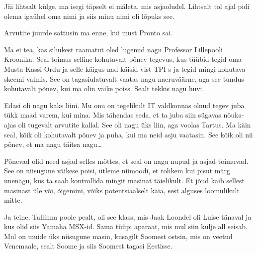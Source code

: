 \label{sisu:pronto}
                 

Jäi lihtsalt külge, ma isegi täpselt ei mäleta, mis asjaoludel. Lihtsalt tol 
ajal pidi olema igaühel oma nimi ja siis minu nimi oli lõpuks see.


Arvutite juurde sattusin ma enne, kui must Pronto sai.

Ma ei tea, kas sihukest raamatut oled lugenud nagu Professor Lillepooli 
Kroonika. 
Seal toimus selline kohutavalt põnev tegevus, kus tüübid tegid oma Musta Kassi 
Ordu ja selle käigus nad käisid vist TPI-s ja tegid mingi kohutava skeemi 
valmis. See on  tagasiulatuvalt vaatas nagu naeruväärne, aga see tundus 
kohutavalt  põnev, kui ma  olin väike poiss. Sealt tekkis nagu huvi. 

Edasi oli nagu kaks liini. Mu onu on tegelikult IT valdkonnas olnud tegev juba 
tükk maad varem, kui mina. Mis tähendas seda, et ta juba siin sügavas 
nõuka-ajas oli tugevalt arvutite kallal. See oli nagu üks liin, aga voolas 
Tartus. Ma käin seal, kõik oli kohutavalt põnev ja puha, kui ma neid asju 
vaatasin. See kõik oli nii põnev, et ma nagu täitsa nagu\ldots


Põnevad olid need asjad selles mõttes, et seal on nagu nupud ja asjad toimuvad. 
See on niisugune väikese poisi, ütleme niimoodi, et rohkem kui pisut märg 
unenägu, kus ta saab kontrollida mingit masinat täielikult. Et jõud käib 
sellest masinast üle või, õigemini, võiks potentsiaalselt käia, sest alguses 
loomulikult mitte. 

Ja teine, Tallinna poole pealt, oli see klass, mis Jaak 
Loondel oli Luise tänaval ja kus olid siis Yamaha 
MSX-id. Sama tüüpi aparaat, mis mul siin külje all 
seisab. Mul on muide üks niisugune masin, kusagilt Soomest ostsin, mis on 
veetud Venemaale, sealt Soome ja siis Soomest tagasi Eestisse.

